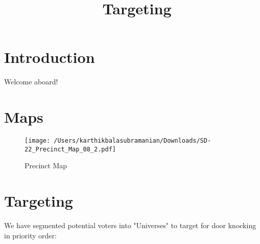 \documentclass{article}
\begin{document}

\title{\currfilebase\ Targeting}
\maketitle

\section{Introduction}

Welcome aboard! 

\section{Maps}

\begin{figure}
  \centering
  \texttt{[image: /Users/karthikbalasubramanian/Downloads/SD-22\_Precinct\_Map\_08\_2.pdf]} 
  \caption{Precinct Map}
\end{figure}


\section{Targeting}

We have segmented potential voters into "Universes" to target for door knocking in priority order:
\end{document}
